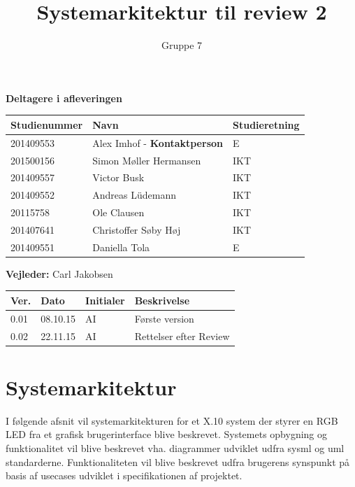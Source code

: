 \documentclass[oneside]{memoir}
\title{Systemarkitektur til review 2}
\author{Gruppe 7}
\begin{document}
		\maketitle

	\textbf{Deltagere i afleveringen}
	\begin{table}[H]
		\centering
		\label{navnetabel}
		\begin{tabular}{|l|l|l|}
			\hline
			Studienummer & Navn                   & Studieretning \\ \hline
			201409553    & Alex Imhof - \textbf{Kontaktperson }            & E             \\ \hline
			201500156    & Simon Møller Hermansen & IKT           \\ \hline
			201409557    & Victor Busk            & IKT           \\ \hline
			201409552    & Andreas Lüdemann       & IKT           \\ \hline
			20115758     & Ole Clausen            & IKT           \\ \hline
			201407641    & Christoffer Søby Høj   & IKT           \\ \hline
			201409551    & Daniella Tola          & E             \\ \hline
		\end{tabular}
	\end{table}
	
\begin{flushleft}
		\textbf{Vejleder: } Carl Jakobsen
\end{flushleft}
\begin{table}[]
	\centering
	\label{my-label}
	\begin{tabular}{|l|l|l|l|}
		\hline
		Ver. & Dato     & Initialer & Beskrivelse    \\ \hline
		0.01 & 08.10.15 & AI        & Første version \\ \hline
		0.02 & 22.11.15 & AI		& Rettelser efter Review \\ \hline
	\end{tabular}
\end{table}
	
		\newpage
		\tableofcontents
		\chapter{Systemarkitektur}
		I følgende afsnit vil systemarkitekturen for et X.10 system der styrer en RGB LED fra et grafisk brugerinterface blive beskrevet. Systemets opbygning og funktionalitet vil blive beskrevet vha. diagrammer udviklet udfra sysml og uml standarderne. Funktionaliteten vil blive beskrevet udfra brugerens synspunkt på basis af usecases udviklet i specifikationen af projektet.
\end{document}
